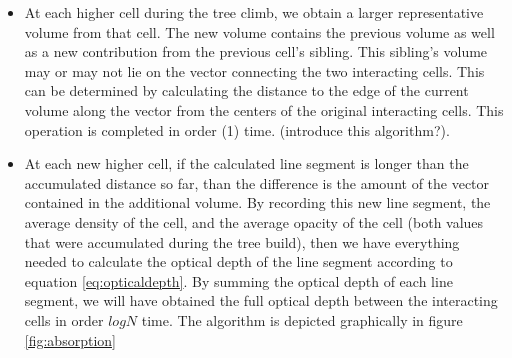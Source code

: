 \begin{itemize}
\item At each higher cell during the tree climb, we obtain a larger representative volume from that cell. The new volume contains the previous volume as well as a new contribution from the previous cell's sibling. This sibling's volume may or may not lie on the vector connecting the two interacting cells. This can be determined by calculating the distance to the edge of the current volume along the vector from the centers of the original interacting cells. This operation is completed in order (1) time. (introduce this algorithm?).
\item At each new higher cell, if the calculated line segment is longer than the accumulated distance so far, than the difference is the amount of the vector contained in the additional volume. By recording this new line segment, the average density of the cell, and the average opacity of the cell (both values that were accumulated during the tree build), then we have everything needed to calculate the optical depth of the line segment according to equation \ref{eq:opticaldepth}. By summing the optical depth of each line segment, we will have obtained the full optical depth between the interacting cells in order $log{N}$ time. The algorithm is depicted graphically in figure \ref{fig:absorption}
\end{itemize}


